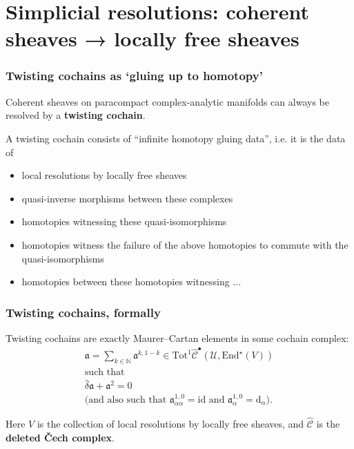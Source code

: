 \documentclass{beamer}
\begin{document}
\section{Simplicial resolutions: coherent sheaves → locally free sheaves}

  \begin{frame}\frametitle{Twisting cochains as `gluing up to homotopy'}
    \begin{lemma}
      Coherent sheaves on paracompact complex-analytic manifolds can always be resolved by a \textbf{twisting cochain}.
    \end{lemma}

    \pause

    A twisting cochain consists of ``infinite homotopy gluing data'', i.e. it is the data of
    \begin{itemize}
      \item local resolutions by locally free sheaves
      \item quasi-inverse morphisms between these complexes
      \item homotopies witnessing these quasi-isomorphisms
      \item homotopies witness the failure of the above homotopies to commute with the quasi-isomorphisms
      \item homotopies between these homotopies witnessing ...
    \end{itemize}
  \end{frame}

  \begin{frame}\frametitle{Twisting cochains, formally}
    Twisting cochains are exactly Maurer--Cartan elements in some cochain complex:
    \[
      \begin{gathered}
        \mathfrak{a} = \sum_{k\in\mathbb{N}} \mathfrak{a}^{k,1-k}
        \in \mathrm{Tot}^1\hat{\mathscr{C}}^\bullet(\mathscr{U},\mathrm{End}^\star(V))
      \\\mbox{such that}
      \\\hat{\delta}\mathfrak{a} + \mathfrak{a}^2 = 0
      \\\mbox{(and also such that $\mathfrak{a}_{\alpha\alpha}^{1,0}=\mathrm{id}$ and $\mathfrak{a}_\alpha^{1,0}=\mathrm{d}_\alpha$).}
      \end{gathered}
    \]

    Here $V$ is the collection of local resolutions by locally free sheaves, and $\hat{\mathscr{C}}$ is the \textbf{deleted Čech complex}.
  \end{frame}
\end{document}
